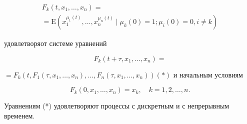 \documentclass[10pt]{article}
\begin{document}
\[

\begin{gathered}

F_{k}\left(t, x_{1}, \ldots, x_{n}\right)= \\

=\mathrm{E}\left(x_{1}^{\mu_{1}(t)}, \ldots, x_{n}^{\mu_{n}(t)} \mid \mu_{k}(0)=1 ; \mu_{i}(0)=0, i \neq k\right)

\end{gathered}

\]



удовлетворяот системе уравнений



\[

F_{k}\left(t+\tau, x_{1}, \ldots, x_{n}\right)=

\]



$=F_{k}\left(t, F_{1}\left(\tau, x_{1}, \ldots, x_{n}\right), \ldots, F_{n}\left(\tau, x_{1}, \ldots, x_{n}\right)\right)(*)$ и начальным условиям



\[

F_{k}\left(0, x_{1}, \ldots, x_{n}\right)=x_{k}, \quad k=1,2, \ldots, n .

\]



Уравнениям (*) удовлетворяют процессы с дискретным и с непрерывным временем.
\end{document}
